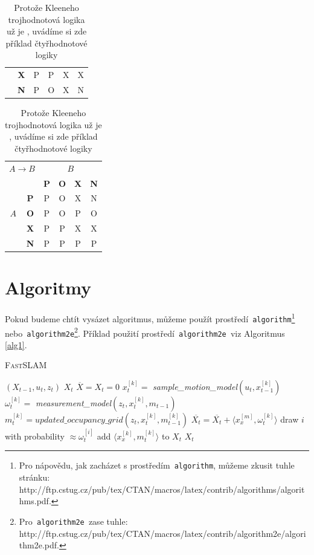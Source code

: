 \documentclass[a4paper, 11pt]{article}
\begin{document}
\begin{table}[h]
\begin{tabular}{|c|c|c|c|c|c|}
		\cline{2-6}
		& \textbf{X} & P & P & X & X\\
		\cline{2-6}
		& \textbf{N} & P & O & X & N\\
		\hline
	\end{tabular}
	\begin{tabular}{|c|c|c|c|c|c|}
		\hline
		\multicolumn{2}{|c|}{{$ A  \rightarrow B $}} & \multicolumn{4}{c|}{$B$}\\
		\cline{3-6}
		\multicolumn{2}{|c|}{} & \textbf{P} & \textbf{O} & \textbf{X} & \textbf{N}\\
		\hline
		& \textbf{P} & P & O & X & N\\
		\cline{2-6}
		{$A$} & \textbf{O} & P & O & P & O\\
		\cline{2-6}
		& \textbf{X} & P & P & X & X\\
		\cline{2-6}
		& \textbf{N} & P & P & P & P\\
		\hline
	\end{tabular}
    \caption{Protože Kleeneho trojhodnotová logika už je , uvádíme si zde příklad čtyřhodnotové logiky}
    \label{tab2}
\end{table}
\newpage

\section{Algoritmy}
\label{sec_alg}

Pokud budeme chtít vysázet algoritmus, můžeme použít prostředí\texttt{ algorithm}\footnote{Pro nápovědu, jak zacházet s prostředím\texttt{ algorithm}, můžeme zkusit tuhle stránku:\\
http://ftp.cstug.cz/pub/tex/CTAN/macros/latex/contrib/algorithms/algorithms.pdf.} nebo\texttt{ algorithm2e}\footnote{Pro\texttt{ algorithm2e }zase tuhle:
http://ftp.cstug.cz/pub/tex/CTAN/macros/latex/contrib/algorithm2e/algorithm2e.pdf.}.
Příklad použití prostředí\texttt{ algorithm2e }viz Algoritmus \ref{alg1}.

\bigskip\bigskip
\begin{algorithm}
    \caption{\textsc{Fast}SLAM}
    \label{alg1}
    \begin{algorithmic}[1]
        \REQUIRE $(X_{t-1}, u_t, z_t)$
        \ENSURE $X_t$
            \STATE $\overline{X} = X_t = 0$
                \STATE $x_t^{[k]} = $ \textit{sample\_motion\_model}$(u_t, x_{t-1}^{[k]})$
                \STATE $\omega_t^{[k]} = $ \textit{measurement\_model}$(z_t, x_t^{[k]}, m_{t-1})$
                \STATE $m_t^{[k]} = updated\_occupancy\_grid(z_t, x_t^{[k]}, m_{t-1}^{[k]})$
                \STATE $\overline{X_t} = \overline{X_t} + \langle x_x^{[m]}, \omega_t^{[k]} \rangle$
            \ENDFOR
                \STATE draw $i$ with probability $\approx \omega_t^{[i]}$
                \STATE add $\langle x_x^{[k]}, m_t^{[k]} \rangle$ to $X_t$
            \ENDFOR
            \RETURN $X_t$
    \end{algorithmic}
\end{algorithm}
\end{document}

